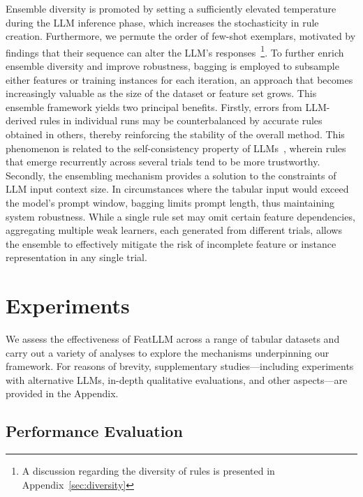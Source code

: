 Ensemble diversity is promoted by setting a sufficiently elevated temperature during the LLM inference phase, which increases the stochasticity in rule creation. Furthermore, we permute the order of few-shot exemplars, motivated by findings that their sequence can alter the LLM's responses~\cite{lu2022fantastically}\footnote{A discussion regarding the diversity of rules is presented in Appendix~\ref{sec:diversity}}. To further enrich ensemble diversity and improve robustness, bagging is employed to subsample either features or training instances for each iteration, an approach that becomes increasingly valuable as the size of the dataset or feature set grows. This ensemble framework yields two principal benefits. Firstly, errors from LLM-derived rules in individual runs may be counterbalanced by accurate rules obtained in others, thereby reinforcing the stability of the overall method. This phenomenon is related to the self-consistency property of LLMs~\cite{wang2022self}, wherein rules that emerge recurrently across several trials tend to be more trustworthy. Secondly, the ensembling mechanism provides a solution to the constraints of LLM input context size. In circumstances where the tabular input would exceed the model's prompt window, bagging limits prompt length, thus maintaining system robustness. While a single rule set may omit certain feature dependencies, aggregating multiple weak learners, each generated from different trials, allows the ensemble to effectively mitigate the risk of incomplete feature or instance representation in any single trial.

\section{Experiments}
We assess the effectiveness of \textsf{FeatLLM} across a range of tabular datasets and carry out a variety of analyses to explore the mechanisms underpinning our framework. For reasons of brevity, supplementary studies—including experiments with alternative LLMs, in-depth qualitative evaluations, and other aspects—are provided in the Appendix.

\subsection{Performance Evaluation}
